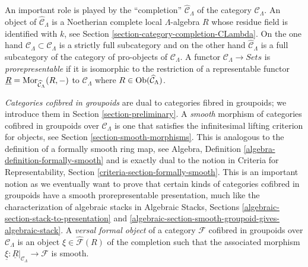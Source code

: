 \medskip\noindent
An important role is played by the ``completion''
$\widehat{\mathcal{C}}_\Lambda$ of the category $\mathcal{C}_\Lambda$.
An object of $\widehat{\mathcal{C}}_\Lambda$ is a Noetherian complete
local $\Lambda$-algebra $R$ whose residue field is identified with $k$, see
Section \ref{section-category-completion-CLambda}.
On the one hand $\mathcal{C}_\Lambda \subset \widehat{\mathcal{C}}_\Lambda$
is a strictly full subcategory and on the other hand
$\widehat{\mathcal{C}}_\Lambda$ is a full subcategory of the category
of pro-objects of $\mathcal{C}_\Lambda$. A functor
$\mathcal{C}_\Lambda \to \textit{Sets}$ is {\it prorepresentable}
if it is isomorphic to the restriction of a representable functor
$\underline{R} = \mathop{\mathrm{Mor}}\nolimits_{\widehat{\mathcal{C}}_\Lambda}(R, -)$
to $\mathcal{C}_\Lambda$ where
$R \in \mathop{\mathrm{Ob}}\nolimits(\widehat{\mathcal{C}}_\Lambda)$.

\medskip\noindent
{\it Categories cofibred in groupoids} are dual to categories fibred in
groupoids; we introduce them in Section \ref{section-preliminary}.
A {\it smooth} morphism of categories cofibred in groupoids over
$\mathcal{C}_\Lambda$ is one that satisfies the infinitesimal lifting
criterion for objects, see
Section \ref{section-smooth-morphisms}.
This is analogous to the definition of a formally smooth ring map, see
Algebra, Definition \ref{algebra-definition-formally-smooth}
and is exactly dual to the notion in
Criteria for Representability, Section \ref{criteria-section-formally-smooth}.
This is an important notion as we eventually want to prove that certain
kinds of categories cofibred in groupoids have a smooth prorepresentable
presentation, much like the characterization of algebraic stacks in
Algebraic Stacks, Sections \ref{algebraic-section-stack-to-presentation} and
\ref{algebraic-section-smooth-groupoid-gives-algebraic-stack}.
A {\it versal formal object} of a category $\mathcal{F}$ cofibred
in groupoids over $\mathcal{C}_\Lambda$ is an object
$\xi \in \widehat{\mathcal{F}}(R)$ of the completion such that the
associated morphism
$\underline{\xi} : \underline{R}|_{\mathcal{C}_\Lambda} \to \mathcal{F}$
is smooth.

